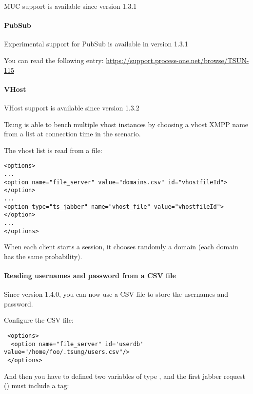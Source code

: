\documentclass{TSUNG-en}
\begin{document}
MUC support is available since version 1.3.1

\paragraph{PubSub}

Experimental support for PubSub is available in version 1.3.1

You can read the following entry: \url{https://support.process-one.net/browse/TSUN-115}

\paragraph{VHost}

VHost support is available since version 1.3.2

Tsung is able to bench multiple vhost instances by choosing a
vhost XMPP name from a list at connection time in the scenario.

The vhost list is read from a file:

\begin{Verbatim}
<options>
...
<option name="file_server" value="domains.csv" id="vhostfileId"></option>
...
<option type="ts_jabber" name="vhost_file" value="vhostfileId"></option>
...
</options>
\end{Verbatim}

When each client starts a session, it chooses randomly a domain (each domain has the
same probability).

\paragraph{Reading usernames and password from a CSV file}

Since version 1.4.0, you can now use a CSV file to store the usernames
and password.

Configure the CSV file:
\begin{Verbatim}
 <options>
  <option name="file_server" id='userdb' value="/home/foo/.tsung/users.csv"/>
 </options>
\end{Verbatim}

And then you have to defined two variables of type ,
and the first jabber request () must include a
 tag:
\end{document}
